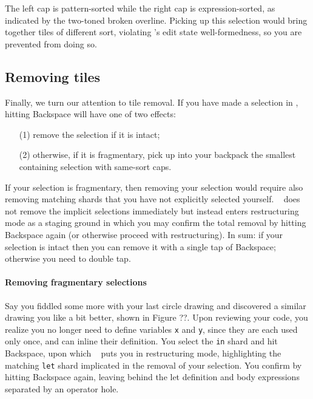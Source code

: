 \noindent
The left cap is pattern-sorted while the right cap
is expression-sorted, as indicated by the two-toned
broken overline.
Picking up this selection would bring together
tiles of different sort, violating \tylr's edit
state well-formedness, so you are prevented from doing so.



\subsection{Removing tiles}
Finally, we turn our attention to tile removal.
If you have made a selection in \tylr, hitting Backspace
will have one of two effects:
\begin{enumerate}
  \item[(1)] remove the selection if it is intact;
  \item[(2)] otherwise, if it is fragmentary, pick up into your backpack
    the smallest containing selection with same-sort caps.
\end{enumerate}
If your selection is fragmentary, then removing
your selection would require also removing matching shards
that you have not explicitly selected yourself.
\tylr~ does not remove the implicit selections immediately
but instead enters restructuring mode as a staging
ground in which you may confirm the total removal
by hitting Backspace again (or otherwise proceed
with restructuring).
In sum: if your selection is intact then you can
remove it with a single tap of Backspace; otherwise
you need to double tap.

\paragraph{Removing fragmentary selections}
Say you fiddled some more with your last circle drawing
and discovered a similar drawing you like a bit better,
shown in Figure ??.
Upon reviewing your code, you realize you no longer
need to define variables \texttt{x} and \texttt{y},
since they are each used only once, and can inline
their definition.
You select the \texttt{in} shard and hit
Backspace, upon which \tylr~ puts you in
restructuring mode, highlighting the matching \texttt{let}
shard implicated in the removal of your selection.
You confirm by hitting Backspace again, leaving behind
the let definition and body expressions separated by
an operator hole.

